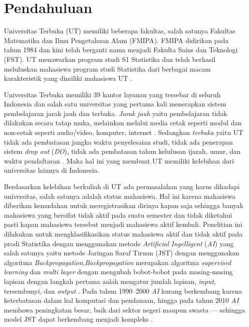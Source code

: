 \section{Pendahuluan}


Universitas Terbuka (UT) memiliki beberapa fakultas, salah satunya Fakultas Matematika dan Ilmu Pengetahuan Alam (FMIPA). FMIPA didirikan pada tahun 1984 dan kini telah berganti nama menjadi Fakulta Sains dan Teknologi (FST). UT menawarkan program studi S1 Statistika dan telah berhasil meluluskan mahasiswa program studi Statistika dari berbagai macam karakteristik yang dimiliki mahasiswa UT \cite{prodi-statistika}.

Universitas Terbuka memiliki 39 kantor layanan yang tersebar di seluruh Indonesia dan salah satu universitas yang pertama kali menerapkan sistem pembelajaran jarak jauh dan terbuka. \textit{Jarak jauh} yaitu pembelajaran tidak dilakukan secara tatap muka, melainkan melalui media cetak seperti modul dan non-cetak seperti audio/video, komputer, internet \cite{univterbuka-2020:katalog}. Sedangkan \textit{terbuka} yaitu UT tidak ada pembatasan jangka waktu penyelesaian studi, tidak ada penerapan sistem \textit{drop out} (\textit{DO}), tidak ada pembatasan tahun kelulusan ijazah, umur, dan waktu pendaftaran \cite{tentang-ut}. Maka hal ini yang membuat UT memiliki kelebihan dari universitas lainnya di Indonesia.

Berdasarkan kelebihan berkuliah di UT ada permasalahan yang harus dihadapi universitas, salah satunya adalah status mahasiswa. Hal ini karena mahasiswa diberikan kemudahan untuk meregistrasikan dirinya kapan saja sehingga banyak mahasiswa yang bersifat tidak aktif pada suatu semester dan tidak diketahui pasti kapan mahasiswa tersebut menjadi mahasiswa aktif kembali. Penelitian ini dilakukan untuk mengklasifikasikan status mahasiswa aktif dan tidak aktif pada prodi Statistika dengan menggunakan metode \textit{Artificial Ingelligent} (\textit{AI}) yang salah satunya yaitu metode Jaringan Saraf Tiruan (JST) dengan menggunakan algoritma \textit{Backpropagation}.\textit{Backpropagation} merupakan algoritma \textit{supervised learning} dan \textit{multi layer} dengan mengubah bobot-bobot pada masing-masing lapisan dengan langkah pertama aalah mengatur jumlah lapisan, \textit{input}, tersembunyi, dan \textit{output} \cite{izhari-2020:analysis-of-backpropagation}. Pada tahun 1990--2000 \textit{AI} kurang berkembang karena keterbatasan dalam hal komputasi dan pendanaan, hingga pada tahun 2010 \textit{AI} membawa peningkatan besar, baik dari sektor negeri maupun swasta --- sehingga model JST dapat berkembang menjadi kompleks \cite{roman-2020:application-metamodel-ANN}.

